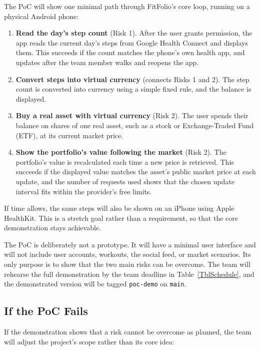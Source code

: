 \documentclass{article}
\begin{document}
The PoC will show one minimal path through FitFolio's core loop, running on a physical Android phone:

\begin{enumerate}
  \item \textbf{Read the day's step count} (Risk 1). After the user grants permission, the app reads the current day's steps from Google Health Connect and displays them. This succeeds if the count matches the phone's own health app, and updates after the team member walks and reopens the app.
  \item \textbf{Convert steps into virtual currency} (connects Risks 1 and 2). The step count is converted into currency using a simple fixed rule, and the balance is displayed.
  \item \textbf{Buy a real asset with virtual currency} (Risk 2). The user spends their balance on shares of one real asset, such as a stock or Exchange-Traded Fund (ETF), at its current market price.
  \item \textbf{Show the portfolio's value following the market} (Risk 2). The portfolio's value is recalculated each time a new price is retrieved. This succeeds if the displayed value matches the asset's public market price at each update, and the number of requests used shows that the chosen update interval fits within the provider's free limits.
\end{enumerate}

If time allows, the same steps will also be shown on an iPhone using Apple HealthKit. This is a stretch goal rather than a requirement, so that the core demonstration stays achievable.

The PoC is deliberately not a prototype. It will have a minimal user interface and will not include user accounts, workouts, the social feed, or market scenarios. 
Its only purpose is to show that the two main risks can be overcome. The team will rehearse the full demonstration by the team deadline in Table~\ref{TblSchedule}, and the demonstrated version will be tagged \texttt{poc-demo} on \texttt{main}.

\subsection{If the PoC Fails}

If the demonstration shows that a risk cannot be overcome as planned, the team will adjust the project's scope rather than its core idea:
\end{document}
